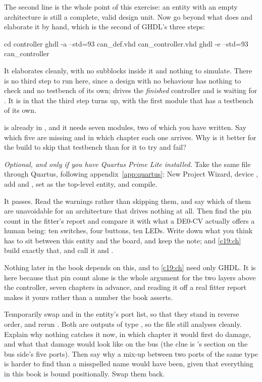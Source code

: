The second line is the whole point of this exercise: an entity with an empty architecture is still a
complete, valid design unit. Now go beyond what  does and elaborate it by
hand, which is the second of GHDL's three steps:

\begin{shell}
cd controller
ghdl -a --std=93 can_def.vhd can_controller.vhd
ghdl -e --std=93 can_controller
\end{shell}

It elaborates cleanly, with no subblocks inside it and nothing to simulate. There is no third step to
run here, since a design with no behaviour has nothing to check and no testbench of its own;
 drives the \emph{finished} controller and is waiting for .
It is in  that the third step turns up, with the first module that has a testbench of
its own.

  is already in , and it needs seven modules, two
of which you have written. Say which five are missing and in which chapter each one arrives. Why is
it better for the build to skip that testbench than for it to try and fail?

 \emph{Optional, and only if you have Quartus Prime Lite installed.} Take the same file
through Quartus, following appendix~\ref{app:quartus}: New Project Wizard, device
, add  and , set
 as the top-level entity, and compile.

It passes. Read the warnings rather than skipping them, and say which of them are unavoidable for an
architecture that drives nothing at all. Then find the pin count in the fitter's report and compare
it with what a DE0-CV actually offers a human being: ten switches, four buttons, ten LEDs. Write down
what you think has to sit between this entity and the board, and keep the note;  and
\ref{c19:ch} build exactly that, and call it  and .

Nothing later in the book depends on this, and  to \ref{c19:ch} need only GHDL. It is
here because that pin count alone is the whole argument for the two layers above the controller,
seven chapters in advance, and reading it off a real fitter report makes it yours rather than a
number the book asserts.

 Temporarily swap  and  in the entity's port list, so that they
stand in reverse order, and rerun . Both are outputs of type
, so the file still analyses cleanly. Explain why nothing catches it now, in which
chapter it would first do damage, and what that damage would look like on the bus (the clue is
's section on the bus side's five ports). Then say why a mix-up between two
ports of the same type is harder to find than a misspelled name would have been, given that
everything in this book is bound positionally. Swap them back.

